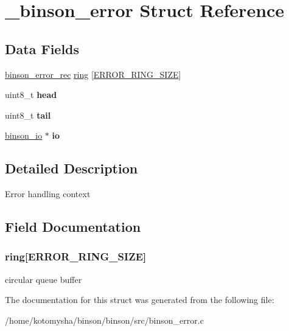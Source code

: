 \hypertarget{struct__binson__error}{\section{\-\_\-binson\-\_\-error Struct Reference}
\label{struct__binson__error}
}
\subsection*{Data Fields}
\begin{DoxyCompactItemize}
\item 
\hyperlink{structbinson__error__rec__}{binson\-\_\-error\-\_\-rec} \hyperlink{struct__binson__error_aef53dce4097de32ec049bbd59459a0a0}{ring} \mbox{[}\hyperlink{binson__config_8h_ac2b9509fa041da44d31525ff8e0883f4}{E\-R\-R\-O\-R\-\_\-\-R\-I\-N\-G\-\_\-\-S\-I\-Z\-E}\mbox{]}
\item 
\hypertarget{struct__binson__error_a9794c0e61506b826b49b458708ae2489}{uint8\-\_\-t {\bfseries head}}\label{struct__binson__error_a9794c0e61506b826b49b458708ae2489}

\item 
\hypertarget{struct__binson__error_a8db7f977b77e4e4d588ef0d3e04ada16}{uint8\-\_\-t {\bfseries tail}}\label{struct__binson__error_a8db7f977b77e4e4d588ef0d3e04ada16}

\item 
\hypertarget{struct__binson__error_ac3e1379fcb1bf00e4541f50350600022}{\hyperlink{structbinson__io__}{binson\-\_\-io} $\ast$ {\bfseries io}}\label{struct__binson__error_ac3e1379fcb1bf00e4541f50350600022}

\end{DoxyCompactItemize}


\subsection{Detailed Description}
Error handling context 

\subsection{Field Documentation}
\hypertarget{struct__binson__error_aef53dce4097de32ec049bbd59459a0a0}{
\subsubsection[{ring}]{ ring\mbox{[}{\bf E\-R\-R\-O\-R\-\_\-\-R\-I\-N\-G\-\_\-\-S\-I\-Z\-E}\mbox{]}}}\label{struct__binson__error_aef53dce4097de32ec049bbd59459a0a0}
circular queue buffer 

The documentation for this struct was generated from the following file\-:\begin{DoxyCompactItemize}
\item 
/home/kotomysha/binson/binson/src/binson\-\_\-error.\-c\end{DoxyCompactItemize}
